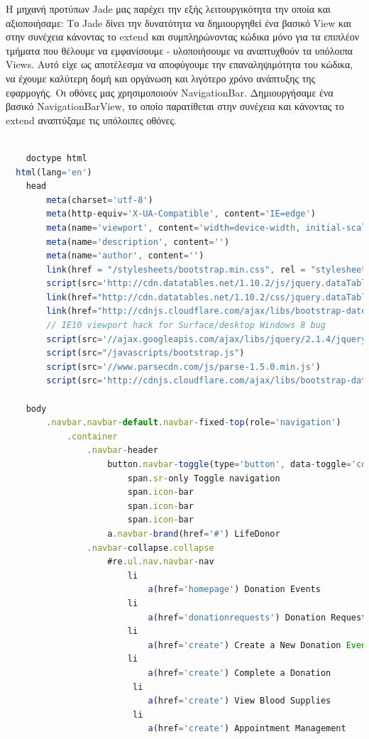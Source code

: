 	Η μηχανή προτύπων Jade μας παρέχει την εξής λειτουργικότητα την οποία και αξιοποιήσαμε: Το Jade δίνει την δυνατότητα να δημιουργηθεί ένα βασικό View και στην συνέχεια κάνοντας το extend και συμπληρώνοντας κώδικα μόνο για τα  επιπλέον τμήματα που θέλουμε να εμφανίσουμε - υλοποιήσουμε να αναπτυχθούν τα υπόλοιπα Views. Αυτό είχε ως αποτέλεσμα να αποφύγουμε την επαναληψιμότητα του κώδικα, να έχουμε καλύτερη δομή και οργάνωση και λιγότερο χρόνο ανάπτυξης της εφαρμογής. Οι οθόνες μας χρησιμοποιούν NavigationBar. Δημιουργήσαμε ένα βασικό NavigationBarView, το οποίο παρατίθεται στην συνέχεια και κάνοντας το extend αναπτύξαμε τις υπόλοιπες οθόνες.
	
	\begin{lstlisting}[language=Javascript]			
	
	doctype html
  html(lang='en')
    head
        meta(charset='utf-8')
        meta(http-equiv='X-UA-Compatible', content='IE=edge')
        meta(name='viewport', content='width=device-width, initial-scale=1')
        meta(name='description', content='')
        meta(name='author', content='')
        link(href = "/stylesheets/bootstrap.min.css", rel = "stylesheet")
        script(src='http://cdn.datatables.net/1.10.2/js/jquery.dataTables.min.js')
        link(href="http://cdn.datatables.net/1.10.2/css/jquery.dataTables.min.css",rel="stylesheet")
        link(href="http://cdnjs.cloudflare.com/ajax/libs/bootstrap-datepicker/1.3.0/css/datepicker.css",rel="stylesheet",type="text/css")
        // IE10 viewport hack for Surface/desktop Windows 8 bug
        script(src='//ajax.googleapis.com/ajax/libs/jquery/2.1.4/jquery.min.js')
        script(src="/javascripts/bootstrap.js")
        script(src='//www.parsecdn.com/js/parse-1.5.0.min.js')
        script(src='http://cdnjs.cloudflare.com/ajax/libs/bootstrap-datepicker/1.3.0/js/bootstrap-datepicker.js')

    body
        .navbar.navbar-default.navbar-fixed-top(role='navigation')
            .container
                .navbar-header
                    button.navbar-toggle(type='button', data-toggle='collapse', data-target='.navbar-collapse')
                        span.sr-only Toggle navigation
                        span.icon-bar
                        span.icon-bar
                        span.icon-bar
                    a.navbar-brand(href='#') LifeDonor
                .navbar-collapse.collapse
                    #re.ul.nav.navbar-nav
                        li
                            a(href='homepage') Donation Events
                        li
                            a(href='donationrequests') Donation Requests
                        li
                            a(href='create') Create a New Donation Event
                        li
                            a(href='create') Complete a Donation
                         li
                            a(href='create') View Blood Supplies
                         li
                            a(href='create') Appointment Management
                            

\end{lstlisting}
